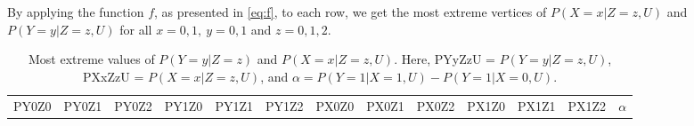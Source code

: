 \documentclass[
]{article}
\theoremstyle{plain}
\begin{document}
By applying the function \(f\), as presented in \eqref{eq:f}, to each row, we get the most extreme vertices of \(P(X = x | Z = z, U)\) and \(P(Y = y | Z = z, U)\) for all \(x=0,1,\ y=0,1\) and \(z=0,1,2\).

\begin{longtable}[]{@{}ccccccccccccc@{}}
\caption{Most extreme values of \(P(Y = y | Z = z)\) and \(P(X = x | Z = z, U)\). Here, PYyZzU = \(P(Y = y | Z = z, U)\), PXxZzU = \(P(X = x | Z = z, U)\), and \(\alpha = P(Y = 1 | X = 1,U) - P(Y = 1 | X = 0,U)\).}\tabularnewline
\toprule
\begin{minipage}[b]{0.05\columnwidth}\centering
PY0Z0\strut
\end{minipage} & \begin{minipage}[b]{0.05\columnwidth}\centering
PY0Z1\strut
\end{minipage} & \begin{minipage}[b]{0.05\columnwidth}\centering
PY0Z2\strut
\end{minipage} & \begin{minipage}[b]{0.05\columnwidth}\centering
PY1Z0\strut
\end{minipage} & \begin{minipage}[b]{0.05\columnwidth}\centering
PY1Z1\strut
\end{minipage} & \begin{minipage}[b]{0.05\columnwidth}\centering
PY1Z2\strut
\end{minipage} & \begin{minipage}[b]{0.05\columnwidth}\centering
PX0Z0\strut
\end{minipage} & \begin{minipage}[b]{0.05\columnwidth}\centering
PX0Z1\strut
\end{minipage} & \begin{minipage}[b]{0.05\columnwidth}\centering
PX0Z2\strut
\end{minipage} & \begin{minipage}[b]{0.05\columnwidth}\centering
PX1Z0\strut
\end{minipage} & \begin{minipage}[b]{0.05\columnwidth}\centering
PX1Z1\strut
\end{minipage} & \begin{minipage}[b]{0.05\columnwidth}\centering
PX1Z2\strut
\end{minipage} & \begin{minipage}[b]{0.07\columnwidth}\centering
\(\alpha\)\strut
\end{minipage}\tabularnewline

\end{longtable}
\end{document}

